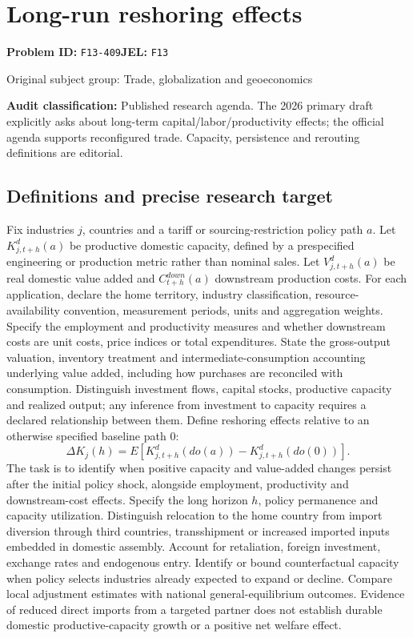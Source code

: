 \documentclass[11pt,a4paper]{article}
\begin{document}
\section*{Long-run reshoring effects}
\textbf{Problem ID:} \texttt{F13-409}\quad \textbf{JEL:} \texttt{F13}\par
\label{problem:OP-0343}
{\sffamily\small\color{muted}Original subject group: Trade, globalization and geoeconomics\par}
\label{definitions:problem:30007625}
\textbf{Audit classification:} Published research agenda. The 2026 primary draft explicitly asks about long-term capital/labor/productivity effects; the official agenda supports reconfigured trade. Capacity, persistence and rerouting definitions are editorial.
\subsection*{Definitions and precise research target}
Fix industries \(j\), countries and a tariff or sourcing-restriction policy path \(a\). Let \(K^d_{j,t+h}(a)\) be productive domestic capacity, defined by a prespecified engineering or production metric rather than nominal sales. Let \(V^d_{j,t+h}(a)\) be real domestic value added and \(C^{down}_{t+h}(a)\) downstream production costs. For each application, declare the home territory, industry classification, resource-availability convention, measurement periods, units and aggregation weights. Specify the employment and productivity measures and whether downstream costs are unit costs, price indices or total expenditures. State the gross-output valuation, inventory treatment and intermediate-consumption accounting underlying value added, including how purchases are reconciled with consumption. Distinguish investment flows, capital stocks, productive capacity and realized output; any inference from investment to capacity requires a declared relationship between them. Define reshoring effects relative to an otherwise specified baseline path \(0\):
\[\Delta K_j(h)=E[K^d_{j,t+h}(do(a))-K^d_{j,t+h}(do(0))].\]
The task is to identify when positive capacity and value-added changes persist after the initial policy shock, alongside employment, productivity and downstream-cost effects. Specify the long horizon \(h\), policy permanence and capacity utilization. Distinguish relocation to the home country from import diversion through third countries, transshipment or increased imported inputs embedded in domestic assembly. Account for retaliation, foreign investment, exchange rates and endogenous entry. Identify or bound counterfactual capacity when policy selects industries already expected to expand or decline. Compare local adjustment estimates with national general-equilibrium outcomes. Evidence of reduced direct imports from a targeted partner does not establish durable domestic productive-capacity growth or a positive net welfare effect.
\end{document}
